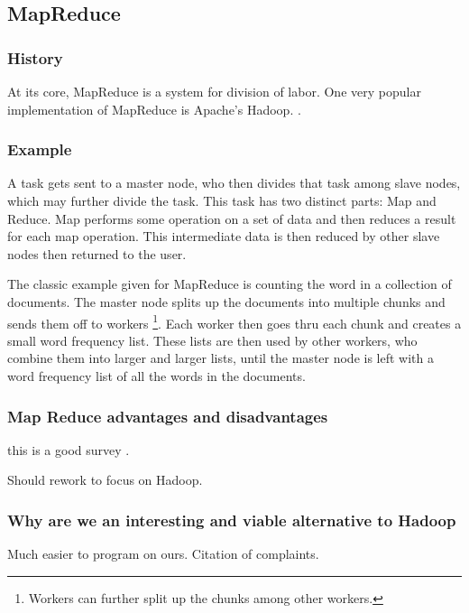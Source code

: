 \documentclass[conference, compsocconf, letterpaper]{IEEEtran}
\begin{document}
\subsection{MapReduce}

\subsubsection{History}

At its core, MapReduce \cite{mapreduce} is a system for division of labor.  One very popular implementation of MapReduce is  Apache's Hadoop. \cite{hadoop}.

\subsubsection{Example}

A task gets sent to a master node, who then divides that task among slave nodes, which may further divide the task.  This task has two distinct parts: Map and Reduce.  Map performs some operation on a set of data and then reduces a result for each map operation.  This intermediate data is then reduced by other slave nodes then returned to the user. 

The classic example given for MapReduce is counting the word in a collection of documents.  The master node splits up the documents into multiple chunks and sends them off to workers  \footnote{Workers can further split up the chunks among other workers.}.  Each worker then goes thru each chunk and creates a small word frequency list.  These lists are then used by other workers, who combine them into larger and larger lists, until the master node is left with a word frequency list of all the words in the documents. 



\subsubsection{Map Reduce advantages and disadvantages}
this is a good survey \cite{mrsurvey}.

Should rework to focus on Hadoop.

\subsubsection{Why are we an interesting and viable alternative to Hadoop}

Much easier to program on ours. Citation of complaints.
\end{document}
